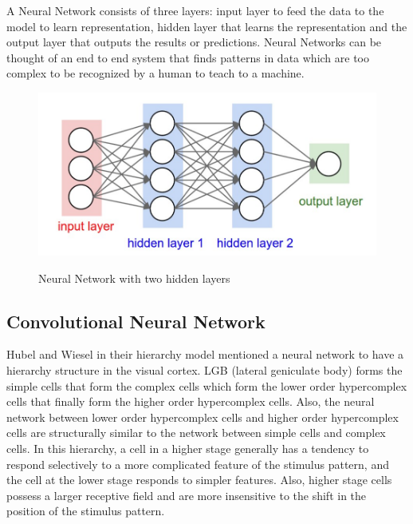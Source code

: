 A Neural Network consists of three layers: input layer to feed the data to the model to learn representation, hidden layer that learns the representation and the output layer that outputs the results or predictions. Neural Networks can be thought of an end to end system that finds patterns in data which are too complex to be recognized by a human to teach to a machine. 


\begin{figure}[H]
\begin{center}
\includegraphics[height=.28\textheight]{Chapter2/Figs/TwoLayeredNN.png}
\label{fig:Two Layered Neural_Network}
\caption{Neural Network with two hidden layers \cite{karparthy}}
\end{center}
\end{figure}


\subsection{Convolutional Neural Network}

Hubel and Wiesel in their hierarchy model mentioned a neural network to have a hierarchy structure in the visual cortex. LGB (lateral geniculate body) forms the simple cells that form the complex cells which form the lower order hypercomplex cells that finally form the higher order hypercomplex cells.
Also, the neural network between lower order hypercomplex cells and higher order hypercomplex cells are structurally similar to the network between simple cells and complex cells. In this hierarchy, a cell in a higher stage generally has a tendency to respond selectively to a more complicated feature of the stimulus pattern, and the cell at the lower stage responds to simpler features. Also, higher stage cells possess a larger receptive field and are more insensitive to the shift in the position of the stimulus pattern.

